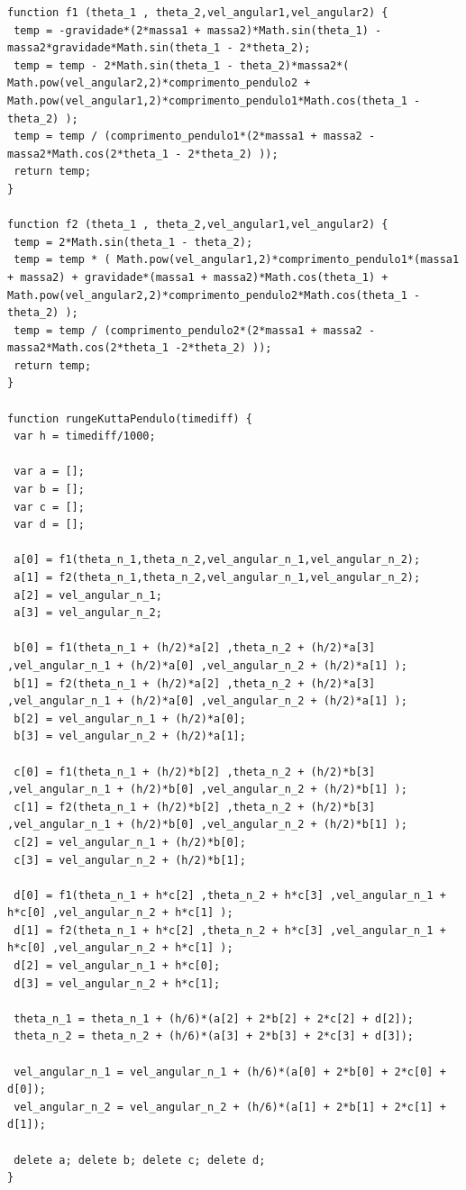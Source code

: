 \documentclass[13pt,a4paper]{report}
\begin{document}
\begin{lstlisting}
function f1 (theta_1 , theta_2,vel_angular1,vel_angular2) {   
 temp = -gravidade*(2*massa1 + massa2)*Math.sin(theta_1) - massa2*gravidade*Math.sin(theta_1 - 2*theta_2);
 temp = temp - 2*Math.sin(theta_1 - theta_2)*massa2*( Math.pow(vel_angular2,2)*comprimento_pendulo2 + Math.pow(vel_angular1,2)*comprimento_pendulo1*Math.cos(theta_1 -theta_2) );
 temp = temp / (comprimento_pendulo1*(2*massa1 + massa2 -massa2*Math.cos(2*theta_1 - 2*theta_2) ));
 return temp;
}

function f2 (theta_1 , theta_2,vel_angular1,vel_angular2) {
 temp = 2*Math.sin(theta_1 - theta_2);
 temp = temp * ( Math.pow(vel_angular1,2)*comprimento_pendulo1*(massa1 + massa2) + gravidade*(massa1 + massa2)*Math.cos(theta_1) + Math.pow(vel_angular2,2)*comprimento_pendulo2*Math.cos(theta_1 - theta_2) );
 temp = temp / (comprimento_pendulo2*(2*massa1 + massa2 - massa2*Math.cos(2*theta_1 -2*theta_2) ));        
 return temp;
}       
           
function rungeKuttaPendulo(timediff) {    
 var h = timediff/1000;

 var a = [];
 var b = [];
 var c = [];
 var d = [];
        
 a[0] = f1(theta_n_1,theta_n_2,vel_angular_n_1,vel_angular_n_2);
 a[1] = f2(theta_n_1,theta_n_2,vel_angular_n_1,vel_angular_n_2);     
 a[2] = vel_angular_n_1;
 a[3] = vel_angular_n_2;         

 b[0] = f1(theta_n_1 + (h/2)*a[2] ,theta_n_2 + (h/2)*a[3] ,vel_angular_n_1 + (h/2)*a[0] ,vel_angular_n_2 + (h/2)*a[1] );
 b[1] = f2(theta_n_1 + (h/2)*a[2] ,theta_n_2 + (h/2)*a[3] ,vel_angular_n_1 + (h/2)*a[0] ,vel_angular_n_2 + (h/2)*a[1] );     
 b[2] = vel_angular_n_1 + (h/2)*a[0];
 b[3] = vel_angular_n_2 + (h/2)*a[1];
            
 c[0] = f1(theta_n_1 + (h/2)*b[2] ,theta_n_2 + (h/2)*b[3] ,vel_angular_n_1 + (h/2)*b[0] ,vel_angular_n_2 + (h/2)*b[1] );
 c[1] = f2(theta_n_1 + (h/2)*b[2] ,theta_n_2 + (h/2)*b[3] ,vel_angular_n_1 + (h/2)*b[0] ,vel_angular_n_2 + (h/2)*b[1] );     
 c[2] = vel_angular_n_1 + (h/2)*b[0];
 c[3] = vel_angular_n_2 + (h/2)*b[1];
            
 d[0] = f1(theta_n_1 + h*c[2] ,theta_n_2 + h*c[3] ,vel_angular_n_1 + h*c[0] ,vel_angular_n_2 + h*c[1] );
 d[1] = f2(theta_n_1 + h*c[2] ,theta_n_2 + h*c[3] ,vel_angular_n_1 + h*c[0] ,vel_angular_n_2 + h*c[1] );     
 d[2] = vel_angular_n_1 + h*c[0];
 d[3] = vel_angular_n_2 + h*c[1];
            
 theta_n_1 = theta_n_1 + (h/6)*(a[2] + 2*b[2] + 2*c[2] + d[2]);  
 theta_n_2 = theta_n_2 + (h/6)*(a[3] + 2*b[3] + 2*c[3] + d[3]);  
            
 vel_angular_n_1 = vel_angular_n_1 + (h/6)*(a[0] + 2*b[0] + 2*c[0] + d[0]);  
 vel_angular_n_2 = vel_angular_n_2 + (h/6)*(a[1] + 2*b[1] + 2*c[1] + d[1]);      
                          
 delete a; delete b; delete c; delete d;
}    
\end{lstlisting}
\clearpage
\end{document}
